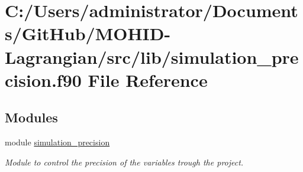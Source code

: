 \hypertarget{simulation__precision_8f90}{}\section{C\+:/\+Users/administrator/\+Documents/\+Git\+Hub/\+M\+O\+H\+I\+D-\/\+Lagrangian/src/lib/simulation\+\_\+precision.f90 File Reference}
\label{simulation__precision_8f90}
\subsection*{Modules}
\begin{DoxyCompactItemize}
\item 
module \hyperlink{namespacesimulation__precision}{simulation\+\_\+precision}
\begin{DoxyCompactList}\small\item\em Module to control the precision of the variables trough the project. \end{DoxyCompactList}\end{DoxyCompactItemize}
